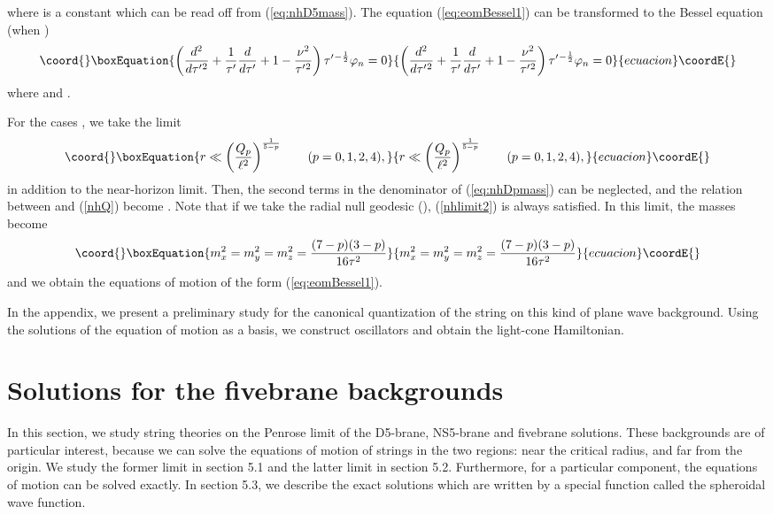 \documentclass[a4paper,12pt]{article}
\begin{document}
where \coordHE{} is a constant which can be read off from 
(\ref{eq:nhD5mass}). The equation (\ref{eq:eomBessel1}) 
can be transformed to the Bessel equation (when \coordHE{})
\begin{equation}\coord{}\boxEquation{
\left({d^2\over d\tau'{}^2}+{1\over \tau'}{d\over d\tau'}
+1- {\nu^2\over \tau'{}^{2}} \right)
\tau'{}^{-{1\over 2}}\varphi_{n}=0
}{
\left({d^2\over d\tau'{}^2}+{1\over \tau'}{d\over d\tau'}
+1- {\nu^2\over \tau'{}^{2}} \right)
\tau'{}^{-{1\over 2}}\varphi_{n}=0
}{ecuacion}\coordE{}\end{equation}
where \coordHE{} and \coordHE{}.

For the cases \coordHE{}, 
we take the limit
\begin{equation}\coord{}\boxEquation{
r\ll \left(Q_{p}\over \ell^2\right)^{1\over 5-p}\qquad(p=0,1,2,4),
\label{nhlimit2}
}{
r\ll \left(Q_{p}\over \ell^2\right)^{1\over 5-p}\qquad(p=0,1,2,4),
}{ecuacion}\coordE{}\end{equation}
in addition to the near-horizon limit.
Then, the second terms in the denominator of (\ref{eq:nhDpmass})
can be neglected, and the relation between \myHighlight{$\tau$}\coordHE{} and \coordHE{} 
(\ref{nhQ}) become \coordHE{}. Note that if we take the radial 
null geodesic (\coordHE{}), (\ref{nhlimit2}) is always satisfied.
In this limit, the masses become
\begin{equation}\coord{}\boxEquation{
m_{x}^2=m_{y}^2=m_{z}^2={(7-p)(3-p)\over 16 \tau^2}
}{
m_{x}^2=m_{y}^2=m_{z}^2={(7-p)(3-p)\over 16 \tau^2}
}{ecuacion}\coordE{}\end{equation}
and we obtain the equations of motion 
of the form (\ref{eq:eomBessel1}).

In the appendix, we present a preliminary study for the canonical
quantization of the string on this kind of plane wave background.
Using the solutions of the equation of motion as a basis,
we construct oscillators and obtain the light-cone Hamiltonian.


\section{Solutions for the fivebrane backgrounds}
In this section, we study string theories on the 
Penrose limit of the D5-brane, NS5-brane and \coordHE{} 
fivebrane solutions. 
These backgrounds are of particular interest, because 
we can solve the equations of motion of strings 
in the two regions: near the critical radius, and
far from the origin.
We study the former limit in section 5.1 and
the latter limit in section 5.2.
Furthermore, for a particular component,
the equations of motion can be solved exactly.
In section 5.3, we describe the exact solutions
which are written
by a special function called the spheroidal wave function.
\end{document}
